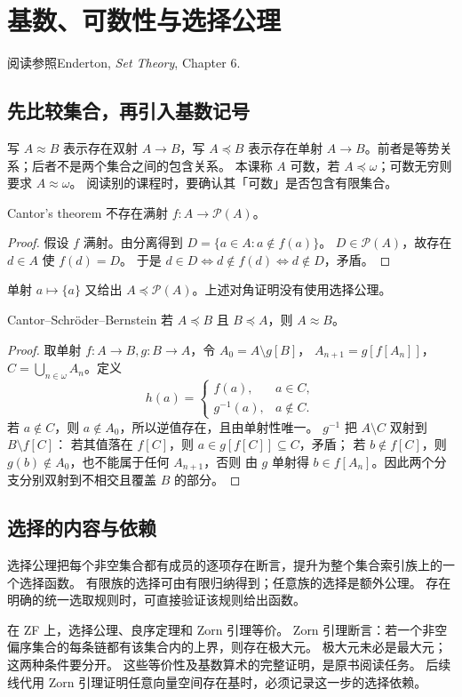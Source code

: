 \chapter{基数、可数性与选择公理}
\begin{qlnote}{阅读参照}Enderton, \emph{Set Theory}, Chapter 6.\end{qlnote}

\section{先比较集合，再引入基数记号}
写 \(A\approx B\) 表示存在双射 \(A\to B\)，写 \(A\preccurlyeq B\) 表示存在单射
\(A\to B\)。前者是等势关系；后者不是两个集合之间的包含关系。
本课称 \(A\) 可数，若 \(A\preccurlyeq\omega\)；可数无穷则要求 \(A\approx\omega\)。
阅读别的课程时，要确认其「可数」是否包含有限集合。

\begin{theorem}{Cantor's theorem}
不存在满射 \(f:A\to\mathcal P(A)\)。
\end{theorem}
\begin{proof}
假设 \(f\) 满射。由分离得到 \(D=\{a\in A:a\notin f(a)\}\)。
\(D\in\mathcal P(A)\)，故存在 \(d\in A\) 使 \(f(d)=D\)。
于是 \(d\in D\Longleftrightarrow d\notin f(d)\Longleftrightarrow d\notin D\)，矛盾。
\end{proof}
单射 \(a\mapsto\{a\}\) 又给出 \(A\preccurlyeq\mathcal P(A)\)。上述对角证明没有使用选择公理。

\begin{theorem}{Cantor--Schröder--Bernstein}
若 \(A\preccurlyeq B\) 且 \(B\preccurlyeq A\)，则 \(A\approx B\)。
\end{theorem}
\begin{proof}
取单射 \(f:A\to B,g:B\to A\)，令 \(A_0=A\setminus g[B]\)，
\(A_{n+1}=g[f[A_n]]\)，\(C=\bigcup_{n\in\omega}A_n\)。定义
\[
 h(a)=\begin{cases}f(a),&a\in C,\\g^{-1}(a),&a\notin C.\end{cases}
\]
若 \(a\notin C\)，则 \(a\notin A_0\)，所以逆值存在，且由单射性唯一。
\(g^{-1}\) 把 \(A\setminus C\) 双射到 \(B\setminus f[C]\)：
若其值落在 \(f[C]\)，则 \(a\in g[f[C]]\subseteq C\)，矛盾；
若 \(b\notin f[C]\)，则 \(g(b)\notin A_0\)，也不能属于任何 \(A_{n+1}\)，否则
由 \(g\) 单射得 \(b\in f[A_n]\)。因此两个分支分别双射到不相交且覆盖 \(B\) 的部分。
\end{proof}

\section{选择的内容与依赖}
选择公理把每个非空集合都有成员的逐项存在断言，提升为整个集合索引族上的一个选择函数。
有限族的选择可由有限归纳得到；任意族的选择是额外公理。
存在明确的统一选取规则时，可直接验证该规则给出函数。

在 ZF 上，选择公理、良序定理和 Zorn 引理等价。
Zorn 引理断言：若一个非空偏序集合的每条链都有该集合内的上界，则存在极大元。
极大元未必是最大元；这两种条件要分开。
这些等价性及基数算术的完整证明，是原书阅读任务。
后续线代用 Zorn 引理证明任意向量空间存在基时，必须记录这一步的选择依赖。
